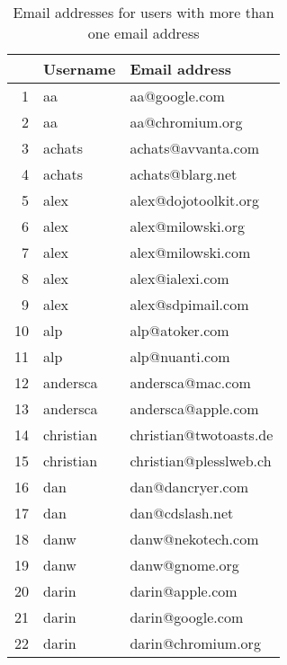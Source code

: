 \begin{table}[!htpb]
\begin{center}
\begin{tabular}{rll}
  \hline
 & Username & Email address \\ 
  \hline
1 & aa & aa@google.com \\ 
  2 & aa & aa@chromium.org \\ 
  3 & achats & achats@avvanta.com \\ 
  4 & achats & achats@blarg.net \\ 
  5 & alex & alex@dojotoolkit.org \\ 
  6 & alex & alex@milowski.org \\ 
  7 & alex & alex@milowski.com \\ 
  8 & alex & alex@ialexi.com \\ 
  9 & alex & alex@sdpimail.com \\ 
  10 & alp & alp@atoker.com \\ 
  11 & alp & alp@nuanti.com \\ 
  12 & andersca & andersca@mac.com \\ 
  13 & andersca & andersca@apple.com \\ 
  14 & christian & christian@twotoasts.de \\ 
  15 & christian & christian@plesslweb.ch \\ 
  16 & dan & dan@dancryer.com \\ 
  17 & dan & dan@cdslash.net \\ 
  18 & danw & danw@nekotech.com \\ 
  19 & danw & danw@gnome.org \\ 
  20 & darin & darin@apple.com \\ 
  21 & darin & darin@google.com \\ 
  22 & darin & darin@chromium.org \\ 
   \hline
\end{tabular}
\caption{Email addresses for users with more than one email address}
\label{emails:multiple}
\end{center}
\end{table}
